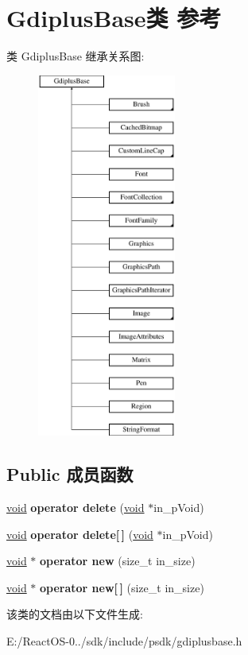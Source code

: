 \hypertarget{class_gdiplus_base}{}\section{Gdiplus\+Base类 参考}
\label{class_gdiplus_base}
类 Gdiplus\+Base 继承关系图\+:\begin{figure}[H]
\begin{center}
\leavevmode
\includegraphics[height=12.000000cm]{class_gdiplus_base}
\end{center}
\end{figure}
\subsection*{Public 成员函数}
\begin{DoxyCompactItemize}
\item 
\mbox{\label{class_gdiplus_base_ac0a93b52559d0dcddd8e2ae9199c28d6}} 
\hyperlink{interfacevoid}{void} {\bfseries operator delete} (\hyperlink{interfacevoid}{void} $\ast$in\+\_\+p\+Void)
\item 
\mbox{\label{class_gdiplus_base_ac89bc35fbdb42f982d9bf9f8b7c790dc}} 
\hyperlink{interfacevoid}{void} {\bfseries operator delete\mbox{[}$\,$\mbox{]}} (\hyperlink{interfacevoid}{void} $\ast$in\+\_\+p\+Void)
\item 
\mbox{\label{class_gdiplus_base_adb3e8bb9005df7aa95865fc5e81e5c65}} 
\hyperlink{interfacevoid}{void} $\ast$ {\bfseries operator new} (size\+\_\+t in\+\_\+size)
\item 
\mbox{\label{class_gdiplus_base_a0ce294378397ed5570e190742091f63e}} 
\hyperlink{interfacevoid}{void} $\ast$ {\bfseries operator new\mbox{[}$\,$\mbox{]}} (size\+\_\+t in\+\_\+size)
\end{DoxyCompactItemize}


该类的文档由以下文件生成\+:\begin{DoxyCompactItemize}
\item 
E\+:/\+React\+O\+S-\/0../sdk/include/psdk/gdiplusbase.\+h\end{DoxyCompactItemize}
